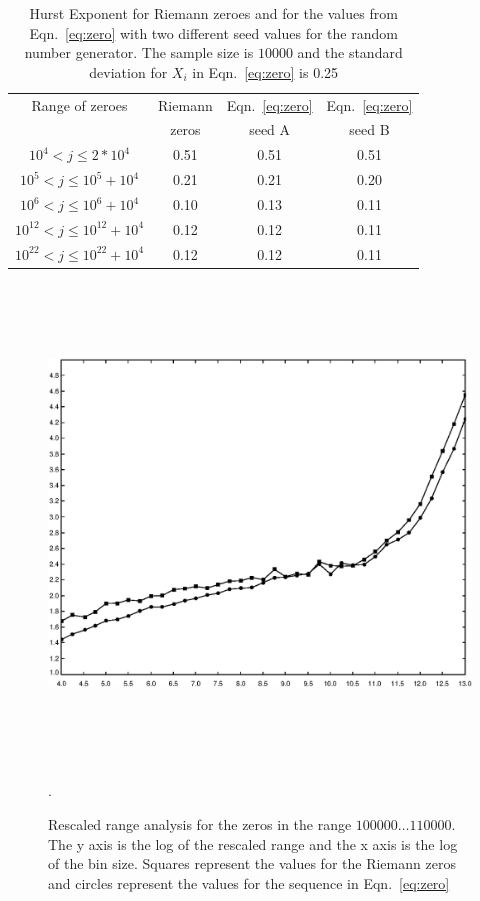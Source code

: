 \documentclass[11pt]{article}
\begin{document}
\begin{table}
\caption{Hurst Exponent for Riemann zeroes
and for the values from Eqn.~\ref{eq:zero} with two
different seed values for the random number generator.
The sample size is $10000$ and the standard deviation
for $X_{i}$ in Eqn.~\ref{eq:zero} is 0.25}
\begin{center} \footnotesize
\begin{tabular}{|c|c|c|c|} \hline
Range of zeroes&Riemann &Eqn.~\ref{eq:zero} &Eqn.~\ref{eq:zero} \\
 & zeros & seed A & seed B \\
\hline
$10^{4} < j \leq 2*10^{4}$ & 0.51 & 0.51& 0.51\\
$10^{5} < j \leq 10^{5} + 10^{4}$ & 0.21 & 0.21& 0.20\\
$10^{6} < j \leq 10^{6} + 10^{4}$ & 0.10 & 0.13&0.11\\
$10^{12} < j \leq 10^{12} + 10^{4}$ & 0.12 & 0.12&0.11\\
$10^{22} < j \leq 10^{22} + 10^{4}$ & 0.12 & 0.12&0.11\\
\hline
\end{tabular}
\end{center}
\label{tab:table1}
\end{table}


\begin{figure}
\vspace {5pt}
\centering
\includegraphics[width=5in,height=5in]{fig_1}
\caption{  Rescaled range analysis for
the zeros  in the range $100000 \ldots 110000$.
The y axis is the log of
the rescaled range
and the x axis is the log of the bin size.
Squares represent the values for the Riemann zeros
and circles represent the values for the sequence in
Eqn.~\ref{eq:zero}}.
\label{fig_1}
\end{figure}
\end{document}
